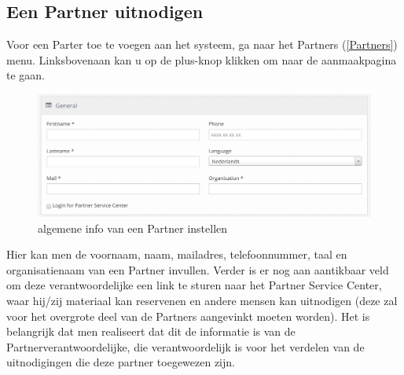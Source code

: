 \documentclass[]{memoir}
\begin{document}
\subsection{Een Partner uitnodigen} \label{AddPartner}
Voor een Parter toe te voegen aan het systeem, ga naar het Partners (\ref{Partners}) menu. Linksbovenaan kan u op de plus-knop klikken om naar de aanmaakpagina te gaan.
\begin{figure}[H]
	\includegraphics[width=\linewidth]{addPartner_general}
	\caption{algemene info van een Partner instellen}
\end{figure}
Hier kan men de voornaam, naam, mailadres, telefoonnummer, taal en organisatienaam van een Partner invullen. Verder is er nog aan aantikbaar veld om deze verantwoordelijke een link te sturen naar het Partner Service Center, waar hij/zij materiaal kan reservenen en andere mensen kan uitnodigen (deze zal voor het overgrote deel van de Partners aangevinkt moeten worden). Het is belangrijk dat men realiseert dat dit de informatie is van de Partnerverantwoordelijke, die verantwoordelijk is voor het verdelen van de uitnodigingen die deze partner toegewezen zijn.
\end{document}
